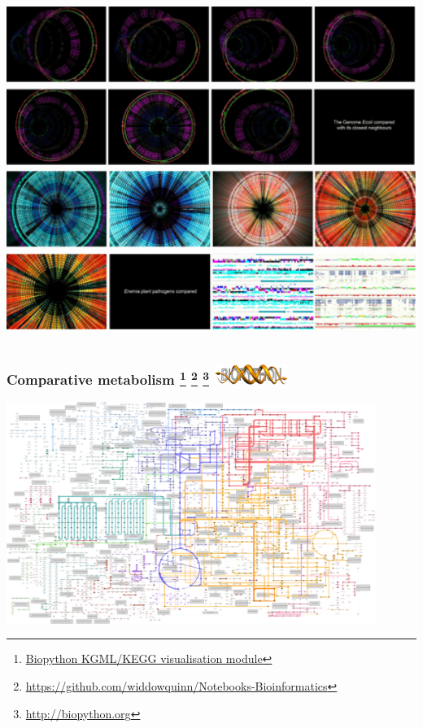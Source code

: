 \begin{frame}
\begin{columns}[T]
\begin{column}{3.5cm}
      \includegraphics[width=1\textwidth]{images/sciart3}
    \end{column}  
  \end{columns}
\end{frame}

\begin{frame}
  \frametitle{Comparative metabolism
    \footnote{\tiny{\href{https://github.com/widdowquinn/notebooks/blob/master/Biopython_KGML_intro.ipynb}{Biopython KGML/KEGG visualisation module}}}
    \footnote{\tiny{\href{https://github.com/widdowquinn/Notebooks-Bioinformatics}{https://github.com/widdowquinn/Notebooks-Bioinformatics}}}
    \footnote{\tiny{\href{http://biopython.org}{http://biopython.org}}}    
    \includegraphics[width=0.18\textwidth]{images/biopython}
  }
  \begin{center}
    \includegraphics[width=0.9\textwidth]{images/dickeya_pathways}
  \end{center}
\end{frame}

